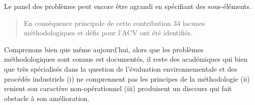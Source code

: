   Le panel des problèmes peut encore être agrandi en spécifiant des sous-éléments.
    \blockcquote[traduction, p.210]{klopffer_background_2014}{
  En conséquence principale de cette contribution 34 lacunes méthodologiques et défis pour l'ACV ont été identifiés.
  }
  
  Comprenons bien que même aujourd'hui, alors que les problèmes méthodologiques sont connus est documentés, il reste des académiques qui bien que très spécialisés dans la question de l'évaluation environnementale et des procédés industriels (i) ne comprennent pas les principes de la méthodologie (ii) renient son caractère non-opérationnel (iii) produisent un discours qui fait obstacle à son amélioration.
  
